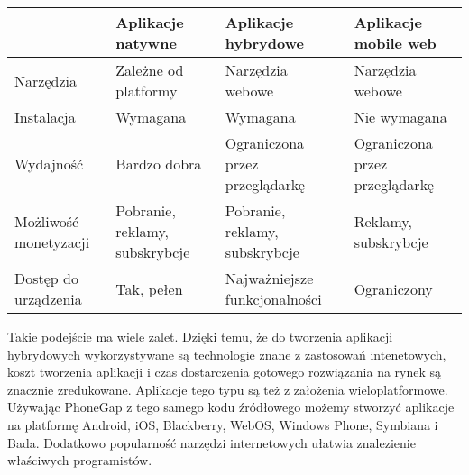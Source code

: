 \documentclass[brudnopis]{xmgr}
\begin{document}
\begin{center}
    \begin{tabular}{ |  p{2cm} | p{4cm} | p{4cm} | p{4cm} |}
    \hline
   			& Aplikacje natywne        & Aplikacje hybrydowe 	& Aplikacje mobile web 			\\ \hline
    Narzędzia	& Zależne od platformy	&   Narzędzia webowe	& 	Narzędzia webowe			\\ \hline
    Instalacja	&        Wymagana               &	 Wymagana         	& 		Nie wymagana		\\ \hline
    Wydajność	& 	Bardzo dobra		&Ograniczona przez przeglądarkę&Ograniczona przez przeglądarkę\\ \hline
    Możliwość monetyzacji
    			&  Pobranie, reklamy, subskrybcje  & Pobranie, reklamy, subskrybcje & Reklamy, subskrybcje \\ \hline
    Dostęp do urządzenia
    			& 	Tak, pełen  	         &Najważniejsze funkcjonalności& Ograniczony        \\ \hline
    \end{tabular}
\end{center}

Takie podejście ma wiele zalet. Dzięki temu, że do tworzenia aplikacji hybrydowych wykorzystywane są technologie
znane z zastosowań intenetowych, koszt tworzenia aplikacji i czas dostarczenia
gotowego rozwiązania na rynek są znacznie zredukowane. Aplikacje tego typu są też
z założenia wieloplatformowe. Używając PhoneGap z tego samego kodu źródłowego
możemy stworzyć aplikacje na platformę Android, iOS, Blackberry, WebOS,
Windows Phone, Symbiana i Bada. Dodatkowo popularność narzędzi internetowych
ułatwia znalezienie właściwych programistów.
\end{document}
